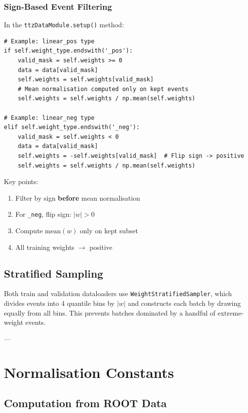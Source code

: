 \documentclass[11pt,a4paper]{article}
\begin{document}
\subsubsection{Sign-Based Event Filtering}

In the \texttt{ttzDataModule.setup()} method:

\begin{lstlisting}
# Example: linear_pos type
if self.weight_type.endswith('_pos'):
    valid_mask = self.weights >= 0
    data = data[valid_mask]
    self.weights = self.weights[valid_mask]
    # Mean normalisation computed only on kept events
    self.weights = self.weights / np.mean(self.weights)

# Example: linear_neg type
elif self.weight_type.endswith('_neg'):
    valid_mask = self.weights < 0
    data = data[valid_mask]
    self.weights = -self.weights[valid_mask]  # Flip sign -> positive
    self.weights = self.weights / np.mean(self.weights)
\end{lstlisting}

\noindent Key points:
\begin{enumerate}
  \item Filter by sign \textbf{before} mean normalisation
  \item For \texttt{\_neg}, flip sign: $|w| > 0$
  \item Compute $\text{mean}(w)$ only on kept subset
  \item All training weights $\to$ positive
\end{enumerate}

\subsection{Stratified Sampling}

Both train and validation dataloaders use \texttt{WeightStratifiedSampler}, which divides events into 
4 quantile bins by $|w|$ and constructs each batch by drawing equally from all bins. This prevents 
batches dominated by a handful of extreme-weight events.

---

\section{Normalisation Constants}

\subsection{Computation from ROOT Data}
\end{document}
